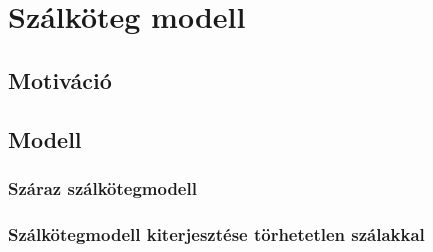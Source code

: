 \chapter{Szálköteg modell}
\label{chapt:fbm}

\begin{comment}
A szálköteg modelles munkáról a következőket fogom leírni: Ábrákról még lövésem sincs....
1. Motiváció
2. Modell
	- A modell kiterjesztése
	- nevezetes mennyiségek... 
	- a kiterjesztett modell
3. Globális terhelés eloszlás
	Egyik cikk alapján
	- vizsgált mennyiségek, következtetés, eredmények
	- az új univerzalitási osztály, speciális viselkedés észrevétele eloszlástól föggően
	- lavinaeloszlás új eredménye, ennek analitikus meghatározása
4. Lokális terhelés eloszlás
	Másik cikk alapján
	- kritikus viselkedés nagyon alacsony esetben
	- példa a mikroszálas kompozitok esetében
	- lavina eloszlások, skála eredmények vizsgálata 
	- 
\end{comment}


\section{Motiváció}

\section{Modell}
\subsection{Száraz szálkötegmodell}
\subsection{Szálkötegmodell kiterjesztése törhetetlen szálakkal}




